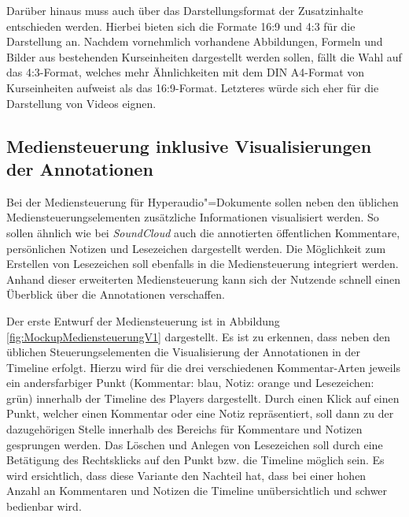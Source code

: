 Darüber hinaus muss auch über das Darstellungsformat der Zusatzinhalte entschieden werden. Hierbei bieten sich die Formate 16:9 und 4:3 für die Darstellung an. Nachdem vornehmlich vorhandene Abbildungen, Formeln und Bilder aus bestehenden Kurseinheiten dargestellt werden sollen, fällt die Wahl auf das 4:3-Format, welches mehr Ähnlichkeiten mit dem DIN A4-Format von Kurseinheiten aufweist als das 16:9-Format. Letzteres würde sich eher für die Darstellung von Videos eignen.


\subsection{Mediensteuerung inklusive Visualisierungen der Annotationen}
\label{sub:Mediensteuerung}
Bei der Mediensteuerung für Hyperaudio"=Dokumente sollen neben den üblichen Mediensteuerungselementen zusätzliche Informationen visualisiert werden. So sollen ähnlich wie bei \textit{SoundCloud} auch die annotierten öffentlichen Kommentare, persönlichen Notizen und Lesezeichen dargestellt werden. Die Möglichkeit zum Erstellen von Lesezeichen soll ebenfalls in die Mediensteuerung integriert werden. Anhand dieser erweiterten Mediensteuerung kann sich der Nutzende schnell einen Überblick über die Annotationen verschaffen.

Der erste Entwurf der Mediensteuerung ist in Abbildung \ref{fig:MockupMediensteuerungV1} dargestellt. Es ist zu erkennen, dass neben den üblichen Steuerungselementen die Visualisierung der Annotationen in der Timeline erfolgt. Hierzu wird für die drei verschiedenen Kommentar-Arten jeweils ein andersfarbiger Punkt (Kommentar: blau, Notiz: orange und Lesezeichen: grün) innerhalb der Timeline des Players dargestellt. Durch einen Klick auf einen Punkt, welcher einen Kommentar oder eine Notiz repräsentiert, soll dann zu der dazugehörigen Stelle innerhalb des Bereichs für Kommentare und Notizen gesprungen werden. Das Löschen und Anlegen von Lesezeichen soll durch eine Betätigung des Rechtsklicks auf den Punkt bzw. die Timeline möglich sein. Es wird ersichtlich, dass diese Variante den Nachteil hat, dass bei einer hohen Anzahl an Kommentaren und Notizen die Timeline unübersichtlich und schwer bedienbar wird.

